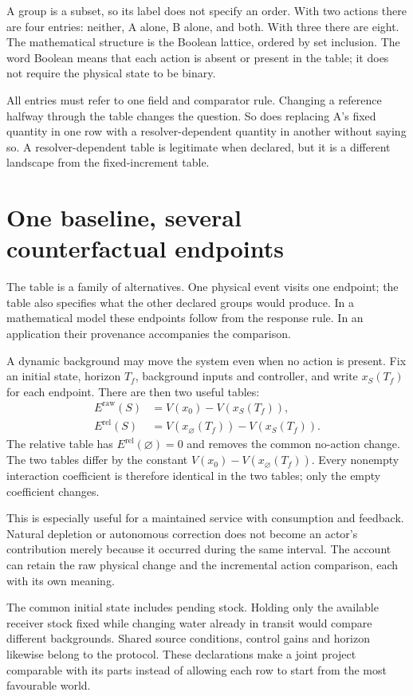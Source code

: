 A group is a subset, so its label does not specify an order. With two actions there are four entries: neither, A alone, B alone, and both. With three there are eight. The mathematical structure is the Boolean lattice, ordered by set inclusion. The word Boolean means that each action is absent or present in the table; it does not require the physical state to be binary.

All entries must refer to one field and comparator rule. Changing a reference halfway through the table changes the question. So does replacing A's fixed quantity in one row with a resolver-dependent quantity in another without saying so. A resolver-dependent table is legitimate when declared, but it is a different landscape from the fixed-increment table.

\section{One baseline, several counterfactual endpoints}
The table is a family of alternatives. One physical event visits one endpoint; the table also specifies what the other declared groups would produce. In a mathematical model these endpoints follow from the response rule. In an application their provenance accompanies the comparison.

A dynamic background may move the system even when no action is present. Fix an initial state, horizon $T_f$, background inputs and controller, and write $x_S(T_f)$ for each endpoint. There are then two useful tables:
\begin{align}\label{eq:coalition-drift-baselines}
 E^{\mathrm{raw}}(S)&=V(x_0)-V(x_S(T_f)),\\
 E^{\mathrm{rel}}(S)&=V(x_\varnothing(T_f))-V(x_S(T_f)).
\end{align}
The relative table has $E^{\mathrm{rel}}(\varnothing)=0$ and removes the common no-action change. The two tables differ by the constant $V(x_0)-V(x_\varnothing(T_f))$. Every nonempty interaction coefficient is therefore identical in the two tables; only the empty coefficient changes.

This is especially useful for a maintained service with consumption and feedback. Natural depletion or autonomous correction does not become an actor's contribution merely because it occurred during the same interval. The account can retain the raw physical change and the incremental action comparison, each with its own meaning.

The common initial state includes pending stock. Holding only the available receiver stock fixed while changing water already in transit would compare different backgrounds. Shared source conditions, control gains and horizon likewise belong to the protocol. These declarations make a joint project comparable with its parts instead of allowing each row to start from the most favourable world.

